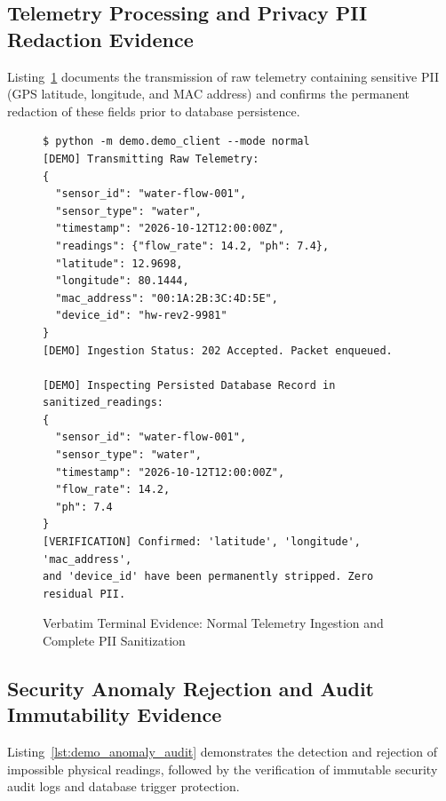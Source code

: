 \subsection{Telemetry Processing and Privacy PII Redaction Evidence}
Listing~\ref{lst:demo_telemetry_anon} documents the transmission of raw telemetry containing sensitive PII (GPS latitude, longitude, and MAC address) and confirms the permanent redaction of these fields prior to database persistence.

\begin{figure}[H]
\centering
\begin{minipage}{0.95\linewidth}
\begin{verbatim}
$ python -m demo.demo_client --mode normal
[DEMO] Transmitting Raw Telemetry:
{
  "sensor_id": "water-flow-001",
  "sensor_type": "water",
  "timestamp": "2026-10-12T12:00:00Z",
  "readings": {"flow_rate": 14.2, "ph": 7.4},
  "latitude": 12.9698,
  "longitude": 80.1444,
  "mac_address": "00:1A:2B:3C:4D:5E",
  "device_id": "hw-rev2-9981"
}
[DEMO] Ingestion Status: 202 Accepted. Packet enqueued.

[DEMO] Inspecting Persisted Database Record in sanitized_readings:
{
  "sensor_id": "water-flow-001",
  "sensor_type": "water",
  "timestamp": "2026-10-12T12:00:00Z",
  "flow_rate": 14.2,
  "ph": 7.4
}
[VERIFICATION] Confirmed: 'latitude', 'longitude', 'mac_address',
and 'device_id' have been permanently stripped. Zero residual PII.
\end{verbatim}
\end{minipage}
\caption{Verbatim Terminal Evidence: Normal Telemetry Ingestion and Complete PII Sanitization}
\label{lst:demo_telemetry_anon}
\end{figure}

\subsection{Security Anomaly Rejection and Audit Immutability Evidence}
Listing~\ref{lst:demo_anomaly_audit} demonstrates the detection and rejection of impossible physical readings, followed by the verification of immutable security audit logs and database trigger protection.

